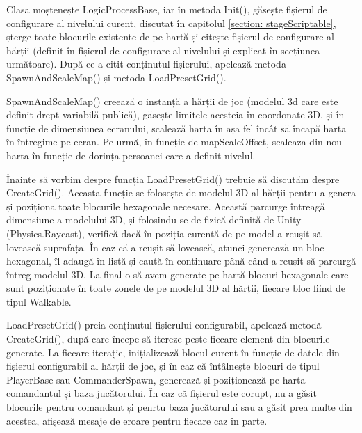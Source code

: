 \documentclass[12pt, a4paper]{article}
\begin{document}
	Clasa moștenește LogicProcessBase, iar în metoda Init(), găsește fișierul de configurare al nivelului curent, discutat în capitolul \ref{section: stageScriptable}, șterge toate blocurile existente de pe hartă și citește fișierul de configurare al hărții (definit în fișierul de configurare al nivelului și explicat în secțiunea următoare). După ce a citit conținutul fișierului, apelează metoda SpawnAndScaleMap() și metoda LoadPresetGrid().
	\newline
	
	SpawnAndScaleMap() creează o instanță a hărții de joc (modelul 3d care este definit drept variabilă publică), găsește limitele acesteia în coordonate 3D, și în funcție de dimensiunea ecranului, scalează harta în așa fel încât să încapă harta în întregime pe ecran. Pe urmă, în funcție de mapScaleOffset, scaleaza din nou harta în funcție de dorința persoanei care a definit nivelul.
	\newline
	
	Înainte să vorbim despre funcția LoadPresetGrid() trebuie să discutăm despre CreateGrid(). Aceasta funcție se folosește de modelul 3D al hărții pentru a genera și poziționa toate blocurile hexagonale necesare. Această parcurge întreagă dimensiune a modelului 3D, și folosindu-se de fizică definită de Unity (Physics.Raycast), verifică dacă în poziția curentă de pe model a reușit să lovească suprafața. În caz că a reușit să lovească, atunci generează un bloc hexagonal, îl adaugă în listă și caută în continuare până când a reușit să parcurgă întreg modelul 3D. La final o să avem generate pe hartă blocuri hexagonale care sunt poziționate în toate zonele de pe modelul 3D al hărții, fiecare bloc fiind de tipul Walkable.
	\newline
	
	LoadPresetGrid() preia conținutul fișierului configurabil, apelează metodă CreateGrid(), după care începe să itereze peste fiecare element din blocurile generate. La fiecare iterație, inițializează blocul curent în funcție de datele din fișierul configurabil al hărții de joc, și în caz că întâlnește blocuri de tipul PlayerBase sau CommanderSpawn, generează și poziționează pe harta comandantul și baza jucătorului. În caz că fișierul este corupt, nu a găsit blocurile pentru comandant și penrtu baza jucătorului sau a găsit prea multe din acestea, afișează mesaje de eroare pentru fiecare caz în parte.
	\newline
	
	
	
	
	
\end{document}
